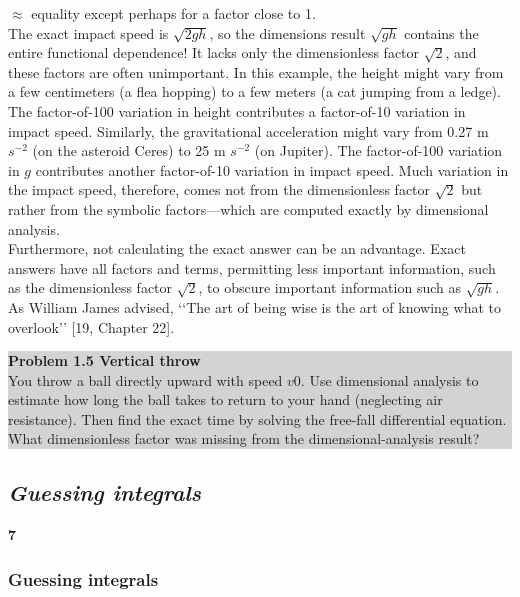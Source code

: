 \documentclass[a4paper]{article}
\begin{document}
$\approx$ equality except perhaps for a factor close to 1.
\\

The exact impact speed is $\sqrt{2gh}$, so the dimensions result $\sqrt{gh}$ contains
the entire functional dependence! It lacks only the dimensionless factor
$\sqrt{2}$, and these factors are often unimportant. In this example, the height
might vary from a few centimeters (a flea hopping) to a few meters (a cat
jumping from a ledge). The factor-of-100 variation in height contributes
a factor-of-10 variation in impact speed. Similarly, the gravitational acceleration
might vary from 0.27 m $s^{-2}$ (on the asteroid Ceres) to 25 m $s^{-2}$ (on
Jupiter). The factor-of-100 variation in $g$ contributes another factor-of-10
variation in impact speed. Much variation in the impact speed, therefore,
comes not from the dimensionless factor $\sqrt{2}$  but rather from the symbolic
factors—which are computed exactly by dimensional analysis.
\\

Furthermore, not calculating the exact answer can be an advantage. Exact
answers have all factors and terms, permitting less important information,
such as the dimensionless factor $\sqrt{2}$, to obscure important information
such as $\sqrt{gh}$. As William James advised, ‘‘The art of being wise is the art
of knowing what to overlook’’
[19, Chapter 22].
\\

\colorbox{lightgray}{
\begin{minipage}{\textwidth}
 {\normalsize\textbf{Problem 1.5 Vertical throw}
 \\
You throw a ball directly upward with speed $v0$. Use dimensional analysis to
estimate how long the ball takes to return to your hand (neglecting air resistance).
Then find the exact time by solving the free-fall differential equation. What
dimensionless factor was missing from the dimensional-analysis result?}
\end{minipage}
}

\newpage
\subsection{\textit{Guessing integrals}}\hfill \textbf{7} \\ 
\subsubsection{Guessing integrals}
\end{document}
